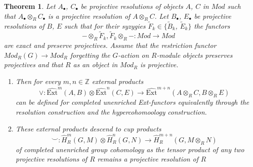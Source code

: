 \documentclass[12pt, a4paper]{article}
\numberwithin{equation}{section}
\newtheorem{thm}{Theorem}[section]
\theoremstyle{empty}
\theoremstyle{nonumberplain}
\begin{document}
\begin{thm}\label{thm:extandcupprod}
Let $A_{\bullet}$, $C_{\bullet}$ be projective resolutions of objects $A$, $C$ in $Mod$ such that  $A_{\bullet} \otimes_R C_{\bullet}$ is a projective resolution of $A \otimes_R C$. Let $B_{\bullet}$, $E_{\bullet}$ be projective resolutions of $B$, $E$ such that for their syzygies $\widetilde{F}_k \in \lbrace \widetilde{B}_k$, $\widetilde{E}_k \rbrace$ the functors
\[ - \otimes_R \widetilde{F}_k, \widetilde{F}_k \otimes_R -: Mod \rightarrow Mod \]
are exact and preserve projectives. Assume that the restriction functor $Mod_R(G) \rightarrow Mod_R$ forgetting the $G$-action on $R$-module objects preserves projectives and that $R$ as an object in $Mod_R$ is projective.
\begin{enumerate}
    \item Then for every $m, n \in \mathbb{Z}$ external products
    \[ \vee: \widehat{\mathrm{Ext}}^m(A, B) \otimes \widehat{\mathrm{Ext}}^n(C, E) \rightarrow \widehat{\mathrm{Ext}}^{m+n}(A  \otimes_R C, B \otimes_R E) \]
    can be defined for completed unenriched Ext-functors equivalently through the resolution construction and the hypercohomoology construction.
    \item These external products descend to cup products
    \[ \smile: \widehat{H}_R^m(G, M) \otimes \widehat{H}_R^n(G, N) \rightarrow \widehat{H}_R^{m+n}(G, M \otimes_R N) \]
    of completed unenriched group cohomology as the tensor product of any two projective resolutions of $R$ remains a projective resolution of $R$
\end{enumerate}
\end{thm}
\end{document}

